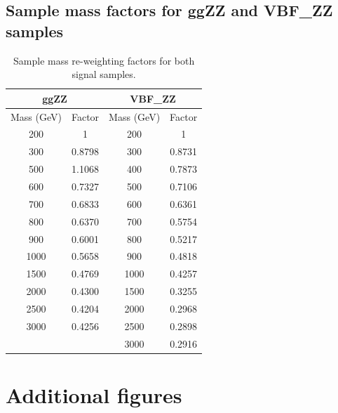 \section{Sample mass factors for ggZZ and VBF\_ZZ samples}
\label{apdx:mass_wgts}
\begin{table}[]
    \centering
\begin{tabular}{|c|c|c|c|}
\hline
\multicolumn{2}{|c|}{ggZZ} & \multicolumn{2}{c|}{VBF\_ZZ} \\ \hline
Mass (GeV)     & Factor    & Mass (GeV)      & Factor     \\ \hline
200            & 1         & 200             & 1          \\ \hline
300            & 0.8798    & 300             & 0.8731     \\ \hline
500            & 1.1068    & 400             & 0.7873     \\ \hline
600            & 0.7327    & 500             & 0.7106     \\ \hline
700            & 0.6833    & 600             & 0.6361     \\ \hline
800            & 0.6370    & 700             & 0.5754     \\ \hline
900            & 0.6001    & 800             & 0.5217     \\ \hline
1000           & 0.5658    & 900             & 0.4818     \\ \hline
1500           & 0.4769    & 1000            & 0.4257     \\ \hline
2000           & 0.4300    & 1500            & 0.3255     \\ \hline
2500           & 0.4204    & 2000            & 0.2968     \\ \hline
3000           & 0.4256    & 2500            & 0.2898     \\ \hline
               &           & 3000            & 0.2916     \\ \hline
\end{tabular}
\caption{Sample mass re-weighting factors for both signal samples.}
\end{table}

\chapter{Additional figures}
\pagebreak
